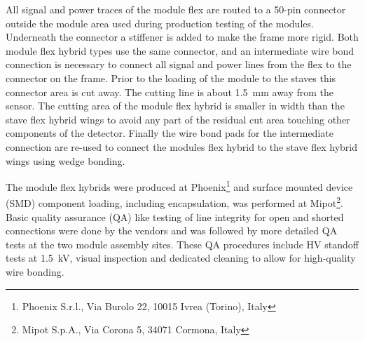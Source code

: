 All signal and power traces of the module flex are routed to a 50-pin connector outside the module area used during production testing of the modules. Underneath the connector a stiffener is added to make the frame more rigid. Both module flex hybrid types use the same connector, and an intermediate wire bond connection is necessary to connect all signal and power lines from the flex to the connector on the frame. Prior to the loading of the module to the staves this connector area is cut away. The cutting line is about \SI{1.5}{\milli\meter} away from the sensor. The cutting area of the module flex hybrid is smaller in width than the stave flex hybrid wings to avoid any part of the residual cut area touching other components of the detector. Finally the wire bond pads for the intermediate connection are re-used to connect the modules flex hybrid to the stave flex hybrid wings using wedge bonding. 

The module flex hybrids were produced at Phoenix\footnote{Phoenix S.r.l., Via Burolo 22, 10015 Ivrea (Torino), Italy} and surface mounted device (SMD) component loading, including encapsulation, was performed at Mipot\footnote{Mipot S.p.A., Via Corona 5, 34071 Cormona, Italy}. Basic quality assurance (QA) like testing of line integrity for open and shorted connections were done by the vendors and was followed by more detailed QA tests at the two module assembly sites. These QA procedures include HV standoff tests at 1.5~kV, visual inspection and dedicated cleaning to allow for high-quality wire bonding.


